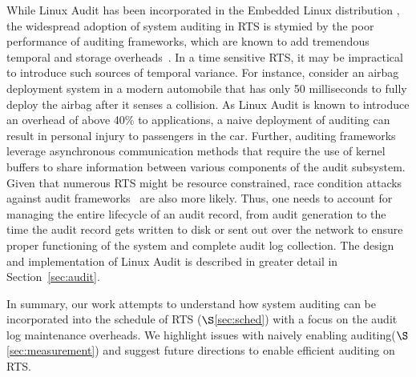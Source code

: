 While Linux Audit has been incorporated in the Embedded Linux distribution \cite{elinux}, the widespread adoption of system auditing in RTS is stymied by the poor performance of auditing frameworks, which are known to add tremendous temporal and storage overheads~\cite{Ma2018}. In a time sensitive RTS, it may be impractical to introduce such sources of temporal variance. For instance, consider an airbag deployment system in a modern automobile that has only 50 milliseconds to fully deploy the airbag after it senses a collision. As Linux Audit is known to introduce an overhead of above 40\% to applications, a naive deployment of auditing can result in personal injury to passengers in the car. Further, auditing frameworks leverage asynchronous communication methods that require the use of kernel buffers to share information between various components of the audit subsystem. Given that numerous RTS might be resource constrained, race condition attacks against audit frameworks~\cite{Paccagnella2020a} are also more likely. Thus, one needs to account for managing the entire lifecycle of an audit record, from audit generation to the time the audit record gets written to disk or sent out over the network to ensure proper functioning of the system and complete audit log collection. The design and implementation of Linux Audit is described in greater detail in Section~{\ref{sec:audit}}.

In summary, our work attempts to understand how system auditing can be incorporated into the schedule of RTS ($\S$\ref{sec:sched}) with a focus on the audit log maintenance overheads. We highlight issues  with naively enabling auditing($\S$\ref{sec:measurement}) and suggest future directions to enable efficient auditing on RTS. 


